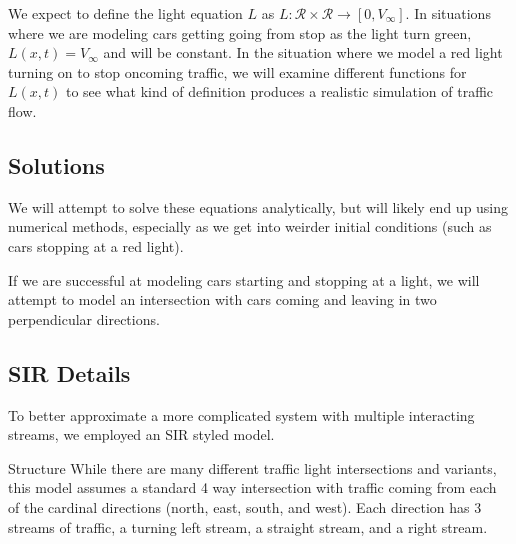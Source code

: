 \documentclass[12pt]{article}
\begin{document}
We expect to define the light equation $L$ as $L : \mathcal{R} \times \mathcal{R} \to [0, V_\infty]$. In situations where we are modeling cars getting going from stop as the light turn green, $L(x, t) = V_\infty$ and will be constant. In the situation where we model a red light turning on to stop oncoming traffic, we will examine different functions for $L(x, t)$ to see what kind of definition produces a realistic simulation of traffic flow. 

\subsection{Solutions}

We will attempt to solve these equations analytically, but will likely end up using numerical methods, especially as we get into weirder initial conditions (such as cars stopping at a red light). 

If we are successful at modeling cars starting and stopping at a light, we will attempt to model an intersection with cars coming and leaving in two perpendicular directions.


\subsection{SIR Details}
To better approximate a more complicated system with multiple interacting streams, we employed an SIR styled model. 

Structure
While there are many different traffic light intersections and variants, this model assumes a standard 4 way intersection with traffic coming from each of the cardinal directions (north, east, south, and west). Each direction has 3 streams of traffic, a turning left stream, a straight stream, and a right stream. 
\end{document}
